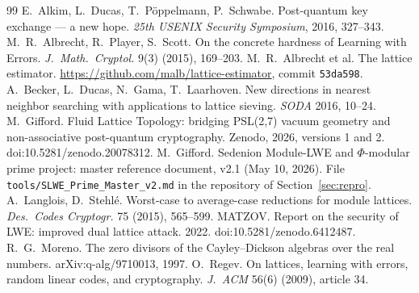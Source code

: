 \documentclass[11pt]{article}
\theoremstyle{remark}
\begin{document}
\begin{thebibliography}{99}\small
{} E.~Alkim, L.~Ducas, T.~P\"oppelmann, P.~Schwabe. Post-quantum key exchange --- a new hope.
  \emph{25th USENIX Security Symposium}, 2016, 327--343.
 M.~R.~Albrecht, R.~Player, S.~Scott. On the concrete hardness of Learning with Errors.
  \emph{J.\ Math.\ Cryptol.} 9(3) (2015), 169--203.
 M.~R.~Albrecht et al. The lattice estimator.
  \url{https://github.com/malb/lattice-estimator}, commit \texttt{53da598}.
 A.~Becker, L.~Ducas, N.~Gama, T.~Laarhoven. New directions in nearest neighbor searching with
  applications to lattice sieving. \emph{SODA} 2016, 10--24.
 M.~Gifford. Fluid Lattice Topology: bridging PSL(2,7) vacuum geometry and non-associative
  post-quantum cryptography. Zenodo, 2026, versions 1 and 2. doi:10.5281/zenodo.20078312.
 M.~Gifford. Sedenion Module-LWE and $\Phi$-modular prime project: master reference document, v2.1
  (May 10, 2026). File \texttt{tools/SLWE\_Prime\_Master\_v2.md} in the repository of Section~\ref{sec:repro}.
 A.~Langlois, D.~Stehl\'e. Worst-case to average-case reductions for module lattices.
  \emph{Des.\ Codes Cryptogr.} 75 (2015), 565--599.
 MATZOV. Report on the security of LWE: improved dual lattice attack. 2022.
  doi:10.5281/zenodo.6412487.
 R.~G.~Moreno. The zero divisors of the Cayley--Dickson algebras over the real numbers.
  arXiv:q-alg/9710013, 1997.
 O.~Regev. On lattices, learning with errors, random linear codes, and cryptography.
  \emph{J.\ ACM} 56(6) (2009), article 34.
\end{thebibliography}
\end{document}
